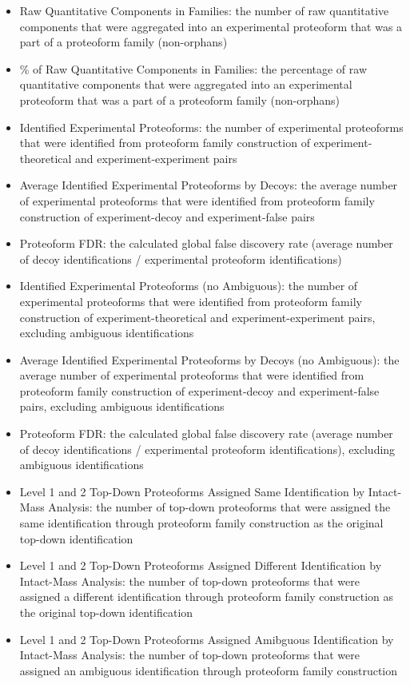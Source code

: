 \begin{itemize}
\begin{itemize}
\item Raw Quantitative Components in Families: the number of raw quantitative components that were aggregated into an experimental proteoform that was a part of a proteoform family (non-orphans)
\item \% of Raw Quantitative Components in Families:  the percentage of raw quantitative components that were aggregated into an experimental proteoform that was a part of a proteoform family (non-orphans)
\item Identified Experimental Proteoforms: the number of experimental proteoforms that were identified from proteoform family construction of experiment-theoretical and experiment-experiment pairs
\item Average Identified Experimental Proteoforms by Decoys: the average number of experimental proteoforms that were identified from proteoform family construction of experiment-decoy and experiment-false pairs
\item Proteoform FDR: the calculated global false discovery rate (average number of decoy identifications / experimental proteoform identifications)
\item Identified Experimental Proteoforms (no Ambiguous): the number of experimental proteoforms that were identified from proteoform family construction of experiment-theoretical and experiment-experiment pairs, excluding ambiguous identifications
\item Average Identified Experimental Proteoforms by Decoys (no Ambiguous): the average number of experimental proteoforms that were identified from proteoform family construction of experiment-decoy and experiment-false pairs, excluding ambiguous identifications
\item Proteoform FDR:  the calculated global false discovery rate (average number of decoy identifications / experimental proteoform identifications), excluding ambiguous identifications
\item Level 1 and 2 Top-Down Proteoforms Assigned Same Identification by Intact-Mass Analysis: the number of top-down proteoforms that were assigned the same identification through proteoform family construction as the original top-down identification
\item Level 1 and 2 Top-Down Proteoforms Assigned Different Identification by Intact-Mass Analysis: the number of top-down proteoforms that were assigned a different identification through proteoform family construction as the original top-down identification
\item Level 1 and 2 Top-Down Proteoforms Assigned Amibguous Identification by Intact-Mass Analysis: the number of top-down proteoforms that were assigned an ambiguous identification through proteoform family construction

\end{itemize}
\end{itemize}
